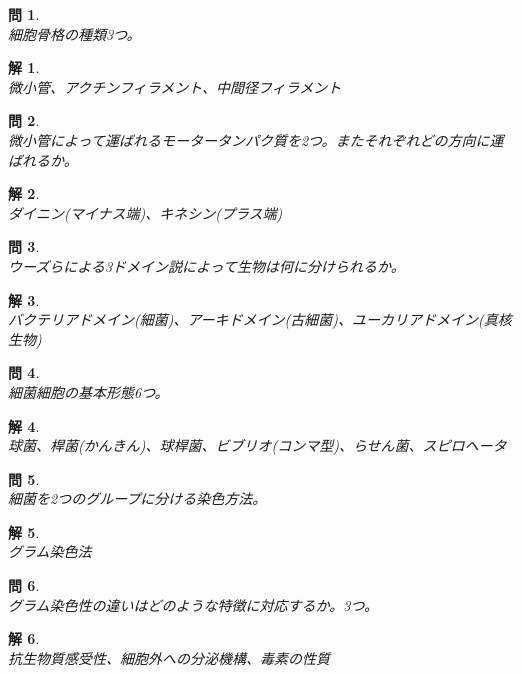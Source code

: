 \documentclass{jsarticle}
\newtheorem{pro}{問}[section]
\newtheorem{ans}{解}[section]
\begin{document}
\begin{pro}~\\
    細胞骨格の種類3つ。
\end{pro}
\begin{ans}~\\
微小管、アクチンフィラメント、中間径フィラメント
\end{ans}

\begin{pro}~\\
    微小管によって運ばれるモータータンパク質を2つ。またそれぞれどの方向に運ばれるか。
\end{pro}
\begin{ans}~\\
    ダイニン(マイナス端)、キネシン(プラス端)
\end{ans}

\begin{pro}~\\
    ウーズらによる3ドメイン説によって生物は何に分けられるか。
\end{pro}
\begin{ans}~\\
    バクテリアドメイン(細菌)、アーキドメイン(古細菌)、ユーカリアドメイン(真核生物)
\end{ans}

\begin{pro}~\\
    細菌細胞の基本形態6つ。
\end{pro}
\begin{ans}~\\
    球菌、桿菌(かんきん)、球桿菌、ビブリオ(コンマ型)、らせん菌、スピロヘータ
\end{ans}

\begin{pro}~\\
    細菌を2つのグループに分ける染色方法。
\end{pro}
\begin{ans}~\\
    グラム染色法
\end{ans}

\begin{pro}~\\
    グラム染色性の違いはどのような特徴に対応するか。3つ。
\end{pro}
\begin{ans}~\\
    抗生物質感受性、細胞外への分泌機構、毒素の性質
\end{ans}
\end{document}

